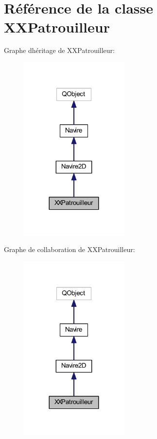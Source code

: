 \hypertarget{class_x_x_patrouilleur}{}\section{Référence de la classe X\+X\+Patrouilleur}
\label{class_x_x_patrouilleur}


Graphe d\textquotesingle{}héritage de X\+X\+Patrouilleur\+:
\nopagebreak
\begin{figure}[H]
\begin{center}
\leavevmode
\includegraphics[width=156pt]{class_x_x_patrouilleur__inherit__graph}
\end{center}
\end{figure}


Graphe de collaboration de X\+X\+Patrouilleur\+:
\nopagebreak
\begin{figure}[H]
\begin{center}
\leavevmode
\includegraphics[width=156pt]{class_x_x_patrouilleur__coll__graph}
\end{center}
\end{figure}
